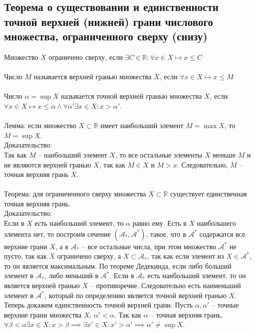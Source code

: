 \documentclass{article}
\begin{document}
    \subsection*{Теорема  о  существовании  и  единственности точной верхней (нижней) грани числового множества, ограниченного сверху (снизу)}
        Множество $X$ ограничено сверху, если $\exists C \in \mathbb{R}: \forall x \in X \longmapsto x \le C$
        \\
        \\
        Число $M$ называется верхней гранью множества $X$, если $\forall x \in X \longmapsto x \le M$
        \\
        \\
        Число $\alpha = \sup X$ называется точной верхней гранью множества $X$, если $\forall x \in X \longmapsto x \le \alpha \wedge \forall \alpha' \exists x \in X: x > \alpha'$.
        \\
        \\
        Лемма: если множество $X \subset \mathbb{R}$ имеет наибольший элемент $M = \max X$, то $M = \sup X$.
        \\
        Доказательство:
        \\
        Так как $M$ -- наибольший элемент $X$, то все остальные элементы $X$ меньше $M$ и не являются верхней гранью $X$, так как
        $M \in X$ и $M > x$. Следовательно, $M$ -- точная верхняя грань $X$.
        \\
        \\
        Теорема: для ограниченного сверху множества $X \subset \mathbb{R}$ существует единственная точная верхняя грань.
        \\
        Доказательство:
        \\
        Если в $X$ есть наибольший элемент, то $\alpha$ равно ему.
        Есть в $X$ наибольшего элемента нет, то построим сечение $(\mathcal{A_*}, \mathcal{A^*})$, такое, что в $\mathcal{A^*}$ содержатся все верхние грани $X$,
        а в $\mathcal{A_*}$ -- все остальные числа, при этом множество $\mathcal{A^*}$ не пусто, так как $X$ ограничено сверху,
        а $X \subset \mathcal{A_*}$, так как если элемент из $X \in \mathcal{A^*}$, то он является максимальным.
        По теореме Дедекинда, если либо больший элемент в $\mathcal{A_*}$, либо меньший в $\mathcal{A^*}$.
        Если в $\mathcal{A_*}$ есть наибольший элемент, то он является верхней гранью $X$ -- противоречие. Следовательно есть наименьший элемент в $\mathcal{A^*}$,
        который по определению является точной верхней гранью $X$.
        \\
        Теперь докажем единственность точной верхней грани.
        Пусть $\alpha, \alpha'$ -- точные верхние грани множества $X$, $\alpha' < \alpha$. Так как $\alpha$ -- точная верхняя грань,
        $\forall \beta < \alpha \exists x \in X: x > \beta \implies \exists x' \in X: x' > {\alpha'} \implies \alpha' \neq \sup X$.
        
\end{document}
